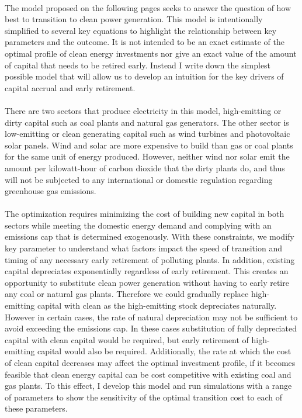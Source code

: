 \documentclass{easychithesis}
\begin{document}
\paragraph{} The model proposed on the following pages seeks to answer the question of how best to transition to clean power generation. This model is intentionally simplified to several key equations to highlight the relationship between key parameters and the outcome. It is not intended to be an exact estimate of the optimal profile of clean energy investments nor give an exact value of the amount of capital that needs to be retired early. Instead I write down the simplest possible model that will allow us to develop an intuition for the key drivers of capital accrual and early retirement. 

\paragraph{} There are two sectors that produce electricity in this model, high-emitting or dirty capital such as coal plants and natural gas generators. The other sector is low-emitting or clean generating capital such as wind turbines and photovoltaic solar panels. Wind and solar are more expensive to build than gas or coal plants for the same unit of energy produced. However, neither wind nor solar emit the amount per kilowatt-hour of carbon dioxide that the dirty plants do, and thus will not be subjected to any international or domestic regulation regarding greenhouse gas emissions. 

\paragraph{} The optimization requires minimizing the cost of building new capital in both sectors while meeting the domestic energy demand and complying with an emissions cap that is determined exogenously. With these constraints, we modify key parameter to understand what factors impact the speed of transition and timing of any necessary early retirement of polluting plants. In addition, existing capital depreciates exponentially regardless of early retirement. This creates an opportunity to substitute clean power generation without having to early retire any coal or natural gas plants. Therefore we could gradually replace high-emitting capital with clean as the high-emitting stock depreciates naturally. However in certain cases, the rate of natural depreciation may not be sufficient to avoid exceeding the emissions cap. In these cases substitution of fully depreciated capital with clean capital would be required, but early retirement of high-emitting capital would also be required. Additionally, the rate at which the cost of clean capital decreases may affect the optimal investment profile, if it becomes feasible that clean energy capital can be cost competitive with existing coal and gas plants. To this effect, I develop this model and run simulations with a range of parameters to show the sensitivity of the optimal transition cost to each of these parameters. 
\end{document}
